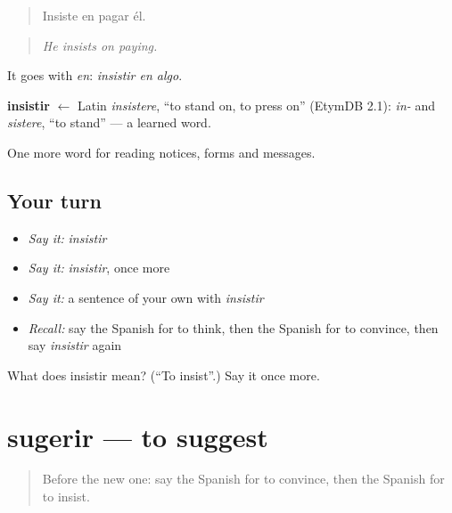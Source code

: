\begin{quote}
Insiste en pagar él.
\end{quote}

\begin{quote}
\emph{He insists on paying.}
\end{quote}

It goes with \emph{en}: \emph{insistir en algo}.

\begin{cousinweb}
\textbf{insistir} $\leftarrow$ Latin \emph{insistere}, \textquotedblleft{}to stand on, to press on\textquotedblright{} (EtymDB 2.1): \emph{in-} and \emph{sistere}, \textquotedblleft{}to stand\textquotedblright{} — a learned word.
\end{cousinweb}

\begin{grammarlens}[title={What you've built}]
One more word for reading notices, forms and messages.
\end{grammarlens}

\subsection*{Your turn}
\begin{itemize}
\raggedright
  \item \emph{Say it:} \emph{insistir}
  \item \emph{Say it:} \emph{insistir}, once more
  \item \emph{Say it:} a sentence of your own with \emph{insistir}
  \item \emph{Recall:} say the Spanish for to think, then the Spanish for to convince, then say \emph{insistir} again
\end{itemize}

\begin{tcolorbox}[breakable,colback=teal!4,colframe=teal!35!black,title={Before you move on}]
What does insistir mean? (\textquotedblleft{}To insist\textquotedblright{}.) Say it once more.
\end{tcolorbox}
\section[sugerir]{sugerir — to suggest}

\label{lesson:ES-C493-sugerir}



\begin{quote}
Before the new one: say the Spanish for to convince, then the Spanish for to insist.
\end{quote}

